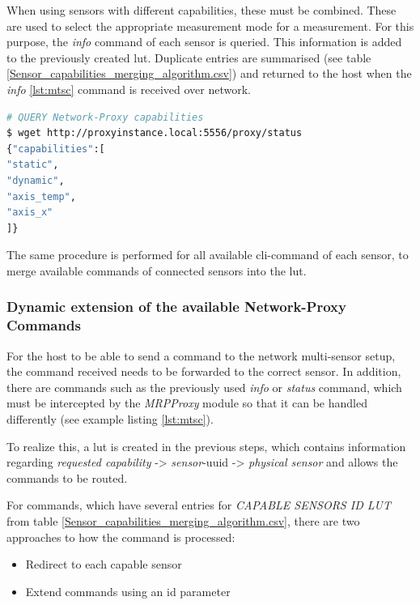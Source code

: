 When using sensors with different capabilities, these must be combined.
These are used to select the appropriate measurement mode for a
measurement. For this purpose, the \emph{info} command of each sensor is
queried. This information is added to the previously created \gls{lut}.
Duplicate entries are summarised (see table
\ref{Sensor_capabilities_merging_algorithm.csv}) and returned to the
host when the \emph{info} \ref{lst:mtsc} command is received over
network.

\begin{lstlisting}[language=bash, caption={MRPProxy REST capabilities query result after executing the merging algorithm}, label=lst:mtsc]
# QUERY Network-Proxy capabilities
$ wget http://proxyinstance.local:5556/proxy/status
{"capabilities":[
"static",
"dynamic",
"axis_temp",
"axis_x"
]}
\end{lstlisting}

The same procedure is performed for all available \gls{cli}-command of
each sensor, to merge available commands of connected sensors into the
\gls{lut}.

\hypertarget{dynamic-extension-of-the-available-network-proxy-commands}{%
\subsubsection{Dynamic extension of the available Network-Proxy
Commands}\label{dynamic-extension-of-the-available-network-proxy-commands}}

For the host to be able to send a command to the network multi-sensor
setup, the command received needs to be forwarded to the correct sensor.
In addition, there are commands such as the previously used \emph{info}
or \emph{status} command, which must be intercepted by the
\emph{MRPProxy} module so that it can be handled differently (see
example listing \ref{lst:mtsc}).

To realize this, a \gls{lut} is created in the previous steps, which
contains information regarding \emph{requested capability}
-\textgreater{} \emph{sensor}-\gls{uuid} -\textgreater{} \emph{physical
sensor} and allows the commands to be routed.

For commands, which have several entries for \emph{CAPABLE SENSORS ID
LUT} from table \ref{Sensor_capabilities_merging_algorithm.csv}, there
are two approaches to how the command is processed:

\begin{itemize}
\tightlist
\item
  Redirect to each capable sensor
\item
  Extend commands using an id parameter
\end{itemize}

